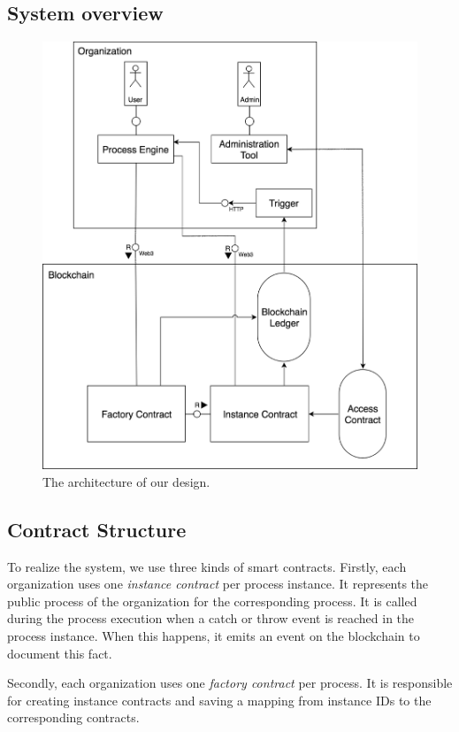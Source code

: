 \documentclass[runningheads]{llncs}
\begin{document}
\subsection{System overview}

\begin{figure}
	\includegraphics[width=\textwidth]{fig/system_diagram.eps}
	\caption{The architecture of our design.} \label{fig1}
\end{figure}

\subsection{Contract Structure}
To realize the system, we use three kinds of smart contracts.
Firstly, each organization uses one \emph{instance contract} per process instance.
It represents the public process of the organization for the corresponding process.
It is called during the process execution when a catch or throw event is reached in the process instance.
When this happens, it emits an event on the blockchain to document this fact.

Secondly, each organization uses one \emph{factory contract} per process.
It is responsible for creating instance contracts and saving a mapping from instance IDs to the corresponding contracts.
\end{document}
